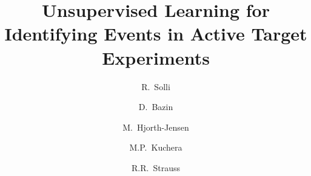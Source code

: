 \documentclass[preprint,12pt]{elsarticle}
\begin{document}
\begin{frontmatter}


\title{Unsupervised Learning  for Identifying  Events in Active Target  Experiments}


\author{R.~Solli}
\address{Expert Analytics AS, Tordenskiolds gate 6, 0160, Oslo, Norway}
\address{Department of Physics, University of Oslo, POB 1048 Oslo, N-0316 Oslo, Norway}
\author{D.~Bazin}
\address{Department of Physics and Astronomy and Facility for Rare Ion Beams and National Superconducting Cyclotron Facility, Michigan State University, East Lansing, MI 48824, USA}
\author{M.~Hjorth-Jensen}
\address{Department of Physics and Astronomy and Facility for Rare Ion Beams and National Superconducting Cyclotron Facility, Michigan State University, East Lansing, MI 48824, USA}
\address{Department of Physics and Center for Computing in Science Education, University of Oslo, POB 1048 Oslo, N-0316 Oslo, Norway}
\author{M.P.~Kuchera}
\address{Department of Physics, Davidson College, Davidson, North Carolina, USA}
\author{R.R.~Strauss}
\address{Department of Mathematics and Computer Science, Davidson College, Davidson, North Carolina, USA}
\address{Department of Computer Science, University of North Carolina, Chapel Hill, North Carolina, USA}






\end{frontmatter}
\end{document}
